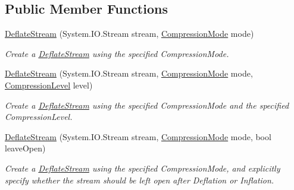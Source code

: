 \subsection*{Public Member Functions}
\begin{DoxyCompactItemize}
\item 
\mbox{\hyperlink{class_super_tiled2_unity_1_1_ionic_1_1_zlib_1_1_deflate_stream_af95bf312acc17bc60b20767178959549}{Deflate\+Stream}} (System.\+I\+O.\+Stream stream, \mbox{\hyperlink{namespace_super_tiled2_unity_1_1_ionic_1_1_zlib_ad5b7635d92497e1c905e5de82eb1c6b1}{Compression\+Mode}} mode)
\begin{DoxyCompactList}\small\item\em Create a \mbox{\hyperlink{class_super_tiled2_unity_1_1_ionic_1_1_zlib_1_1_deflate_stream}{Deflate\+Stream}} using the specified Compression\+Mode. \end{DoxyCompactList}\item 
\mbox{\hyperlink{class_super_tiled2_unity_1_1_ionic_1_1_zlib_1_1_deflate_stream_a58951ff8d7362935e28a4f3663edb9d4}{Deflate\+Stream}} (System.\+I\+O.\+Stream stream, \mbox{\hyperlink{namespace_super_tiled2_unity_1_1_ionic_1_1_zlib_ad5b7635d92497e1c905e5de82eb1c6b1}{Compression\+Mode}} mode, \mbox{\hyperlink{namespace_super_tiled2_unity_1_1_ionic_1_1_zlib_a20f6771804996c363f454ad9765cd7db}{Compression\+Level}} level)
\begin{DoxyCompactList}\small\item\em Create a \mbox{\hyperlink{class_super_tiled2_unity_1_1_ionic_1_1_zlib_1_1_deflate_stream}{Deflate\+Stream}} using the specified Compression\+Mode and the specified Compression\+Level. \end{DoxyCompactList}\item 
\mbox{\hyperlink{class_super_tiled2_unity_1_1_ionic_1_1_zlib_1_1_deflate_stream_a1cd46445ad9e3bf4f433d8822b6519ce}{Deflate\+Stream}} (System.\+I\+O.\+Stream stream, \mbox{\hyperlink{namespace_super_tiled2_unity_1_1_ionic_1_1_zlib_ad5b7635d92497e1c905e5de82eb1c6b1}{Compression\+Mode}} mode, bool leave\+Open)
\begin{DoxyCompactList}\small\item\em Create a {\ttfamily \mbox{\hyperlink{class_super_tiled2_unity_1_1_ionic_1_1_zlib_1_1_deflate_stream}{Deflate\+Stream}}} using the specified {\ttfamily Compression\+Mode}, and explicitly specify whether the stream should be left open after Deflation or Inflation. \end{DoxyCompactList}\item 

\end{DoxyCompactItemize}
